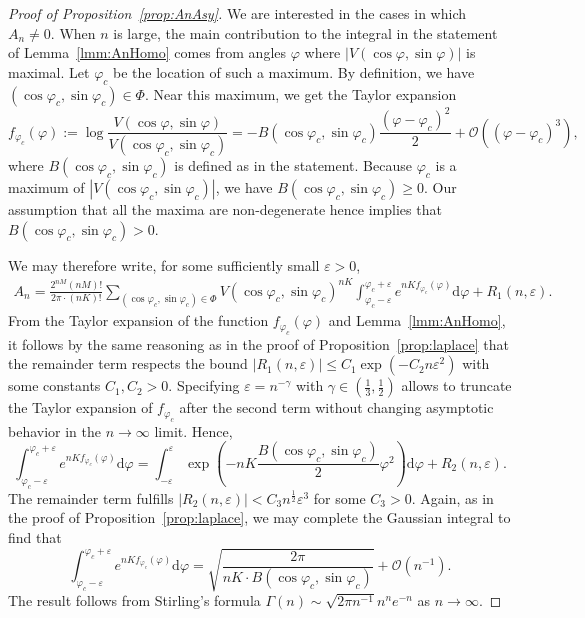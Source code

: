 \documentclass[english]{ourlematemasingle}
\numberwithin{theorem}{section}
\theoremstyle{remark}
\newcommand{\dd}{\mathrm{d}}
\newcommand{\bigO}{\mathcal{O}}
\begin{document}
\begin{proof}[Proof of Proposition~\ref{prop:AnAsy}]
We are interested in the cases in which $A_n\neq 0$.
When $n$ is large, the main contribution to the integral 
in the statement of Lemma~\ref{lmm:AnHomo} comes 
from angles $\varphi$ where $|V(\cos \varphi,\sin \varphi)|$ is 
maximal. Let $\varphi_c$ be the location of such a maximum.
By definition, we have $(\cos \varphi_c,\sin \varphi_c) \in \Phi$.
Near this maximum, we get the Taylor expansion
$$
f_{\varphi_c}(\varphi):=
\log \frac{V(\cos \varphi, \sin \varphi)}{V(\cos \varphi_c, \sin \varphi_c)}
=
-
B(\cos \varphi_c, \sin \varphi_c)
\frac{(\varphi -\varphi_c)^2}{2}
+\bigO((\varphi -\varphi_c)^3),
$$
where $B(\cos \varphi_c, \sin \varphi_c)$ is defined as in the statement.
Because $\varphi_c$ is a maximum of $|V(\cos \varphi_c, \sin \varphi_c)|$, 
we have $B(\cos \varphi_c, \sin \varphi_c) \geq 0$. Our assumption that all the maxima are non-degenerate hence implies that $B(\cos \varphi_c, \sin \varphi_c) > 0$.\par 

We may therefore write, for some sufficiently small $\varepsilon > 0$,
\begin{gather*}
A_n = \frac{2^{nM} (nM)! }{ 2\pi \cdot (nK)!} 
\sum_{(\cos \varphi_c,\sin \varphi_c) \in \Phi}
\!\!\!V(\cos \varphi_c, \sin \varphi_c)^{nK}
\int_{\varphi_c-\varepsilon}^{\varphi_c+\varepsilon} e^{nK f_{\varphi_c}(\varphi)} \dd \varphi + R_1(n,\varepsilon).
\end{gather*}
From the Taylor expansion of the function $f_{\varphi_c}(\varphi)$ and
Lemma~\ref{lmm:AnHomo},
it follows by the same reasoning as in the proof of Proposition~\ref{prop:laplace} that the remainder term respects the bound
$|R_1(n,\varepsilon)| \leq C_1 \exp({-C_2 n \varepsilon^2})$
with some constants $C_1,C_2>0$.
Specifying $\varepsilon = n^{-\gamma}$ with $\gamma \in (\frac13,\frac12)$ allows to truncate the Taylor expansion of $f_{\varphi_c}$ after the second term without changing asymptotic behavior in the $n\rightarrow \infty$ limit. Hence,
$$
\int_{\varphi_c-\varepsilon}^{\varphi_c+\varepsilon} e^{nK f_{\varphi_c}(\varphi)} \dd \varphi =
\int_{-\varepsilon}^{\varepsilon} \exp\left(-nK \frac{B(\cos\varphi_c,\sin \varphi_c)}{2} \varphi^2\right) \dd \varphi + R_2(n, \varepsilon).
$$
The remainder term fulfills $|R_2(n, \varepsilon)| < C_3 n^{\frac12} \varepsilon^3$ for some $C_3>0$.
Again, as in the proof of Proposition~\ref{prop:laplace}, we may complete the Gaussian integral to find that 
$$
\int_{\varphi_c-\varepsilon}^{\varphi_c+\varepsilon} e^{nK f_{\varphi_c}(\varphi)} \dd \varphi = \sqrt{ \frac{2\pi}{nK \cdot B(\cos\varphi_c,\sin \varphi_c)}} + \bigO (n^{-1}).
$$
The result follows from Stirling's formula $\Gamma(n) \sim \sqrt{2\pi n^{-1}} n^n e^{-n}$ as $n \rightarrow \infty$.
\end{proof}
\end{document}
